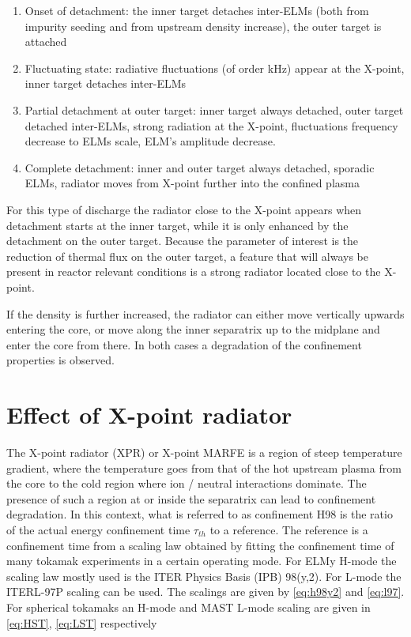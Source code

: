 \begin{enumerate}
    \item Onset of detachment: the inner target detaches inter-ELMs (both from impurity seeding and from upstream density increase), the outer target is attached
    \item Fluctuating state: radiative fluctuations (of order kHz) appear at the X-point, inner target detaches inter-ELMs
    \item Partial detachment at outer target: inner target always detached, outer target detached inter-ELMs, strong radiation at the X-point, fluctuations frequency decrease to ELMs scale, ELM's amplitude decrease.
    \item Complete detachment: inner and outer target always detached, sporadic ELMs, radiator moves from X-point further into the confined plasma
\end{enumerate}

For this type of discharge the radiator close to the X-point appears when detachment starts at the inner target, while it is only enhanced by the detachment on the outer target. Because the parameter of interest is the reduction of thermal flux on the outer target, a feature that will always be present in reactor relevant conditions is a strong radiator located close to the X-point.

If the density is further increased, the radiator can either move vertically upwards entering the core\cite{Bernert2021}, or move along the inner separatrix up to the midplane and enter the core from there.\cite{Lipschultz1984} In both cases a degradation of the confinement properties is observed.

\section{Effect of X-point radiator}\label{Effect of X-point radiator}


The X-point radiator (XPR)\cite{Bernert2021} or X-point MARFE\cite{Kallenbach2015a} is a region of steep temperature gradient, where the temperature goes from that of the hot upstream plasma from the core to the cold region where ion / neutral interactions dominate. The presence of such a region at or inside the separatrix can lead to confinement degradation. In this context, what is referred to as confinement H98 is the ratio of the actual energy confinement time $\tau_{th}$ to a reference. The reference is a confinement time from a scaling law obtained by fitting the confinement time of many tokamak experiments in a certain operating mode. For ELMy H-mode the scaling law mostly used is the ITER Physics Basis (IPB) 98(y,2).\cite{Doyle2007} For L-mode the ITERL-97P scaling can be used. \cite{Kaye1997} The scalings are given by \autoref{eq:h98y2} and \ref{eq:l97}. For spherical tokamaks an H-mode \cite{Kaye2006} and MAST L-mode \cite{Kaye2021} scaling are given in \autoref{eq:HST}, \ref{eq:LST} respectively


